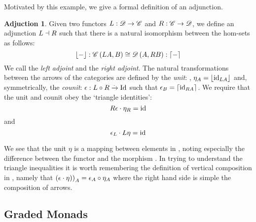 \theoremstyle{definition}\newtheorem*{adjunctiondef}{Adjuction}
Motivated by this example, we give a formal definition of an adjunction.
\begin{adjunctiondef}
    Given two functors $\mathnormal{L}: \mathscr{D} \to \mathscr{C}$ and $\mathnormal{R}:
    \mathscr{C} \to \mathscr{D}$, we define an adjunction $\mathnormal{L} \dashv \mathnormal{R}$  such that there is a natural isomorphism between the
    hom-sets as follows:\cite{RelationalAlgebraByWayOfAdjunctions}
    \[
        \lfloor - \rfloor: \mathscr{C}\left(\mathnormal{L} \mathnormal{A}, B\right) \cong
        \mathscr{D}\left(A, \mathnormal{R} \mathnormal{B}\right) :\lceil - \rceil
    \]
    We call  the \emph{left adjoint} and  the \emph{right
    adjoint}.
    The natural transformations between the arrows of the categories are defined
    by the \emph{unit}: , $\eta_{A} =
    \lfloor \mathrm{id}_{\mathnormal{\mathnormal{L} \mathnormal{A}}} \rfloor$ and, symmetrically, the
    \emph{counit}:
    $\epsilon: \mathnormal{L \circ R} \xrightarrow{.} \mathnormal{\mathrm{Id}}$ such that
    $\epsilon_{B} = \lceil \mathrm{id}_{\mathnormal{\mathnormal{R} \mathnormal{A}}} \rceil$. We
    require that the unit and counit obey the `triangle identities':
\[
            \mathnormal{R} \mathnormal{\epsilon} \cdot \eta_{\mathnormal{R}}
            = \mathrm{id}_{\mathnormal{}}
\] 
    and
\[
    \epsilon_{\mathnormal{L}} \cdot \mathnormal{L} \mathnormal{\eta}
    = \mathrm{id}_{\mathnormal{}}
\]
\end{adjunctiondef}

We see that the unit $\eta$ is a mapping between elements in , noting
especially the difference between the functor  and the
morphism .
In trying to understand the triangle inequalities it is worth remembering the
definition of vertical composition in , namely
that
$\left(\epsilon \cdot \eta)\right)_{\mathnormal{A}} =
\mathnormal{\epsilon_{\mathnormal{A}}} \circ \mathnormal{\eta_{\mathnormal{A}}}$
where the right hand side is simple the composition of arrows.

\subsection{Graded Monads}\label{sec:gradedmonads}
